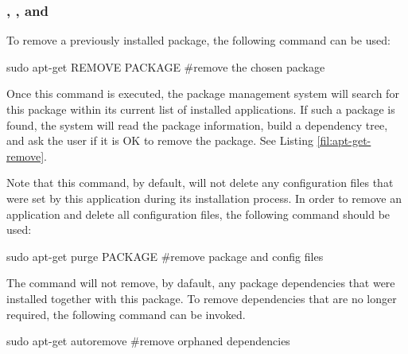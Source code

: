 \subsubsection*{, , and }

To remove a previously installed package, the following command can be used:

\begin{command_line}[make]
sudo apt-get REMOVE PACKAGE #remove the chosen package
\end{command_line}

Once this command is executed, the package management system will search for this package within its current list of installed applications. If such a package is found, the system will read the package information, build a dependency tree, and ask the user if it is OK to remove the package. See Listing \ref{fil:apt-get-remove}.


Note that this command, by default, will not delete any configuration files that were set by this application during its installation process. In order to remove an application and delete all configuration files, the following command should be used:
\begin{command_line}[make]
sudo apt-get purge PACKAGE #remove package and config files 
\end{command_line}

The  command will not remove, by dafault, any package dependencies that were installed together with this package. To remove dependencies that are no longer required, the following command can be invoked.

\begin{command_line}[make]
sudo apt-get autoremove #remove orphaned dependencies 
\end{command_line}


